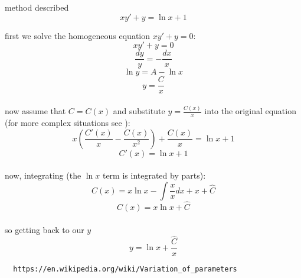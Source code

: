 \documentclass{article}
\begin{document}
method described \cite{wiki} \\

$$ xy' + y = \ln x + 1 $$

first we solve the homogeneous equation $xy' + y = 0$: \\

$$ xy' + y = 0 $$
$$ \frac{dy}{y} = -\frac{dx}{x} $$
$$ \ln y = A - \ln x $$
$$ y = \frac{C}{x} $$ \\

now assume that $C = C(x)$ and substitute $y = \frac{C(x)}{x}$ into the original
equation (for more complex situations see \cite{wiki}): \\

$$ x(\frac{C'(x)}{x} - \frac{C(x)}{x^2}) + \frac{C(x)}{x} = \ln x + 1 $$
$$ C'(x) = \ln x + 1 $$ \\

now, integrating (the $\ln x$ term is integrated by parts): \\

$$ C(x) = x\ln x - \int \frac{x}{x} dx + x + \hat{C} $$
$$ C(x) = x\ln x + \hat{C} $$ \\

so getting back to our $y$ \\

$$ y = \ln x + \frac{\hat{C}}{x} $$


\begin{thebibliography}{9}
\begin{verbatim}
  https://en.wikipedia.org/wiki/Variation_of_parameters
\end{verbatim}
\end{thebibliography}
\end{document}
